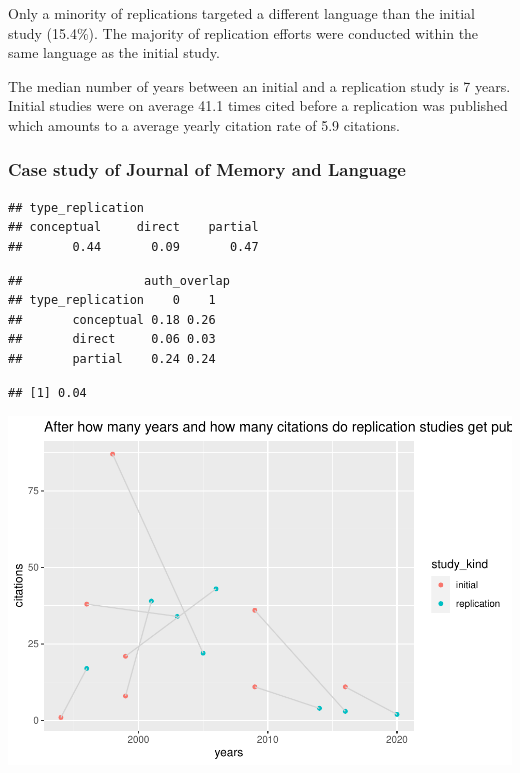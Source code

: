 \documentclass[]{elsarticle} %
\begin{document}
Only a minority of replications targeted a different language than the
initial study (15.4\%). The majority of replication efforts were
conducted within the same language as the initial study.

The median number of years between an initial and a replication study is
7 years. Initial studies were on average 41.1 times cited before a
replication was published which amounts to a average yearly citation
rate of 5.9 citations.

\hypertarget{case-study-of-journal-of-memory-and-language}{%
\subsubsection{Case study of Journal of Memory and
Language}\label{case-study-of-journal-of-memory-and-language}}

\begin{verbatim}
## type_replication
## conceptual     direct    partial 
##       0.44       0.09       0.47
\end{verbatim}

\begin{verbatim}
##                 auth_overlap
## type_replication    0    1
##       conceptual 0.18 0.26
##       direct     0.06 0.03
##       partial    0.24 0.24
\end{verbatim}

\begin{verbatim}
## [1] 0.04
\end{verbatim}

\includegraphics{ReplicationLing_files/figure-latex/plot cit and years direct-1.pdf}
\end{document}
